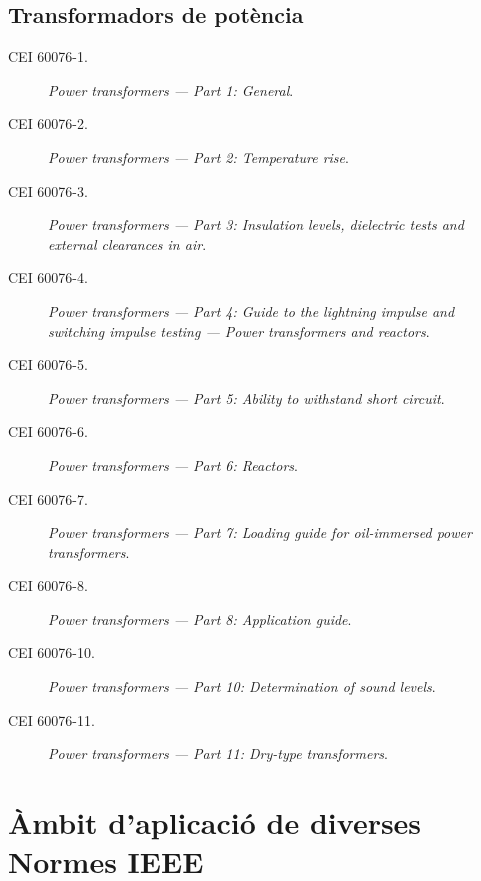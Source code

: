 \subsection*{Transformadors de potència}
\begin{description}
	\item [\hspace{5mm}CEI 60076-1.] \textit{Power transformers --- Part 1: General}.
	\item [\hspace{5mm}CEI 60076-2.] \textit{Power transformers --- Part 2: Temperature rise}.
	\item [\hspace{5mm}CEI 60076-3.] \textit{Power transformers --- Part 3: Insulation levels, dielectric tests and external clearances in air}.
	\item [\hspace{5mm}CEI 60076-4.] \textit{Power transformers --- Part 4: Guide to the lightning impulse and switching impulse testing --- Power transformers and reactors}.
	\item [\hspace{5mm}CEI 60076-5.] \textit{Power transformers --- Part 5: Ability to withstand short circuit}.
	\item [\hspace{5mm}CEI 60076-6.] \textit{Power transformers --- Part 6: Reactors}.
	\item [\hspace{5mm}CEI 60076-7.] \textit{Power transformers --- Part 7: Loading guide for oil-immersed power transformers}.
	\item [\hspace{5mm}CEI 60076-8.] \textit{Power transformers --- Part 8: Application guide}.
	\item [\hspace{5mm}CEI 60076-10.] \textit{Power transformers --- Part 10: Determination of sound levels}.
	\item [\hspace{5mm}CEI 60076-11.] \textit{Power transformers --- Part 11: Dry-type transformers}.
\end{description}


\section{Àmbit d'aplicació de diverses Normes IEEE}\label{sec:normes_IEEE}


